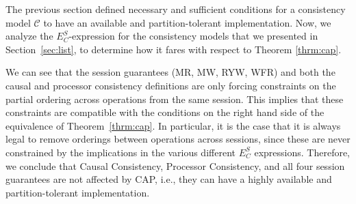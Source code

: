 \documentclass[journal,compsoc]{IEEEtran}
\begin{document}
The previous section defined necessary and sufficient conditions for
a consistency model $\mathcal{C}$ to have an available and partition-tolerant
implementation. Now, we analyze the $E^S_C$-expression for the consistency models that we presented in Section~\ref{sec:list}, to determine how it fares with respect to Theorem \ref{thrm:cap}.

We can see that the session guarantees (MR, MW, RYW, WFR) and both the causal and processor consistency definitions  are  only forcing constraints on the partial ordering across operations from the same session. This implies that these constraints are compatible with the conditions on the right hand side of the equivalence of Theorem~\ref{thrm:cap}. In particular, it is the case that it is always legal to remove orderings between operations across sessions, since these are never constrained by the implications in the various different $E^S_C$ expressions. Therefore, we conclude that Causal Consistency, Processor Consistency, and all four session guarantees are not affected by CAP, i.e., they can have a highly available and partition-tolerant implementation.
\end{document}
